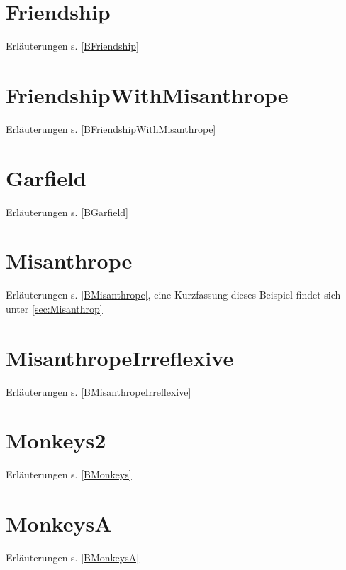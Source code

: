 \documentclass[draft]{scrreprt}
\begin{document}
{\newpage


\section{Friendship} Erläuterungen s. \ref{BFriendship}
\label{Friendship}

\newpage

\section{FriendshipWithMisanthrope} Erläuterungen s. \ref{BFriendshipWithMisanthrope}
\label{FriendshipWithMisanthrope}

\newpage

\section{Garfield}  Erläuterungen s. \ref{BGarfield}
\label{Garfield}


\newpage

\section{Misanthrope} Erläuterungen s. \ref{BMisanthrope}, eine Kurzfassung dieses Beispiel findet sich unter \ref{sec:Misanthrop}
\label{Misanthrope}

\newpage



\section{MisanthropeIrreflexive} Erläuterungen s. \ref{BMisanthropeIrreflexive}
\label{MisanthropeIrreflexive}

\newpage

\section{Monkeys2} Erläuterungen s. \ref{BMonkeys}
\label{Monkeys2}


\newpage

\section{MonkeysA} Erläuterungen s. \ref{BMonkeysA}
\label{MonkeysA}


}
\end{document}
